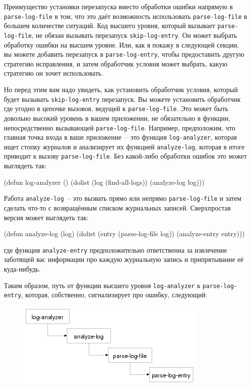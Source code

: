 Преимущество установки перезапуска вместо обработки ошибки напрямую в
\lstinline{parse-log-file} в том, что это даёт возможность использовать \lstinline{parse-log-file} в
большем количестве ситуаций. Код высшего уровня, который вызывает \lstinline{parse-log-file},
не обязан вызывать перезапуск \lstinline{skip-log-entry}. Он может выбрать обработку ошибки на
высшем уровне. Или, как я покажу в следующей секции, вы можете добавить перезапуск в
\lstinline{parse-log-entry}, чтобы предоставить другую стратегию исправления, и затем обработчик
условия может выбрать, какую стратегию он хочет использовать.

Но перед этим вам надо увидеть, как установить обработчик условия, который будет вызывать
\lstinline{skip-log-entry} перезапуск. Вы можете установить обработчик где угодно в
цепочке вызовов, ведущей к \lstinline{parse-log-file}. Это может быть довольно высокий
уровень в вашем приложении, не обязательно в функции, непосредственно вызывающей
\lstinline{parse-log-file}. Например, предположим, что главная точка входа в ваше
приложение~-- это функция \lstinline{log-analyzer}, которая ищет стопку журналов и
анализирует их функцией \lstinline{analyze-log}, которая в итоге приводит к вызову
\lstinline{parse-log-file}. Без какой-либо обработки ошибок это может выглядеть так:

\begin{myverb}
(defun log-analyzer ()
  (dolist (log (find-all-logs))
    (analyze-log log)))
\end{myverb}

Работа \lstinline{analyze-log}~-- это вызвать прямо или непрямо \lstinline{parse-log-file} и затем
сделать что-то с возвращённым списком журнальных записей. Сверхпростая версия может
выглядеть так:

\begin{myverb}
(defun analyze-log (log)
  (dolist (entry (parse-log-file log))
    (analyze-entry entry)))
\end{myverb}

\noindent{}где функция \lstinline{analyze-entry} предположительно ответственна за извлечение заботящей вас
информации про каждую журнальную запись и припрятывание её куда-нибудь.

Таким образом, путь от функции высшего уровня \lstinline{log-analyzer} к
\lstinline{parse-log-entry}, которая, собственно, сигнализирует про ошибку, следующий:

\begin{figure}[h]
  \centering
  \includegraphics[scale=0.7]{images/restart-call-stack.png}
\end{figure}

